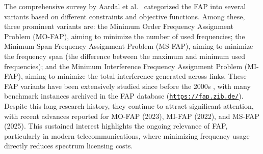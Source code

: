 \documentclass[letterpaper,journal]{IEEEtran}
\begin{document}
The comprehensive survey by Aardal et al.~\cite{Aardal2007} categorized the FAP into several variants based on different constraints and objective functions. 
Among these, three prominent variants are: the Minimum Order Frequency Assignment Problem (MO-FAP), aiming to minimize the number of used frequencies; the Minimum Span Frequency Assignment Problem (MS-FAP), aiming to minimize the frequency span (the difference between the maximum and minimum used frequencies); and the Minimum Interference Frequency Assignment Problem (MI-FAP), aiming to minimize the total interference generated across links. 
These FAP variants have been extensively studied since before the 2000s \cite{Aardal2007}, with many benchmark instances archived in the FAP database (\texttt{\url{https://fap.zib.de/}}). Despite this long research history, they continue to attract significant attention, with recent advances reported for MO-FAP \cite{Gomez2023MO} (2023), MI-FAP \cite{Ceschia2022MI} (2022), and MS-FAP \cite{Lee2025MS} (2025). This sustained interest highlights the ongoing relevance of FAP, particularly in modern telecommunications, where minimizing frequency usage directly reduces spectrum licensing costs.
\end{document}
